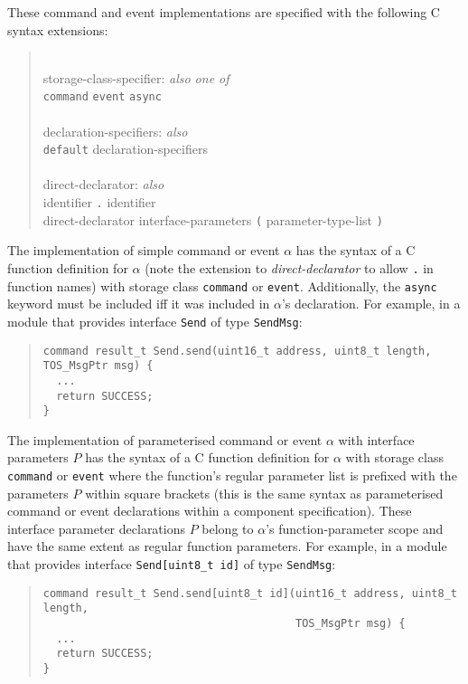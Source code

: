 \documentclass[11pt,letterpaper]{article}
\newcommand{\kw}[1]{{\tt #1}}
\newcommand{\code}[1]{{\tt #1}}
\newcommand{\grammarshift}{\vspace*{-.7cm}}
\newcommand{\grammarindent}{\hspace*{2cm}\= \\ \kill}
\begin{document}
These command and event implementations are specified with the following C
syntax extensions:
\begin{quote} \grammarshift \em \begin{tabbing}
\grammarindent
storage-class-specifier: \emph{also one of}\\
\>	\kw{command} \kw{event} \kw{async}\\
\\
declaration-specifiers: \emph{also}\\
\>	\kw{default} declaration-specifiers\\
\\
direct-declarator: \emph{also}\\
\>	identifier \kw{.} identifier \\
\>	direct-declarator interface-parameters \kw{(} parameter-type-list \kw{)}\\
\end{tabbing} \end{quote}
The implementation of simple command or event $\alpha$ has the syntax of a
C function definition for $\alpha$ (note the extension to
\emph{direct-declarator} to allow \code{.} in function names) with storage
class \kw{command} or \kw{event}. Additionally, the \kw{async} keyword must
be included iff it was included in $\alpha$'s declaration. For example, in
a module that provides interface \code{Send} of type \kw{SendMsg}:
\begin{quote} \begin{verbatim}
command result_t Send.send(uint16_t address, uint8_t length, TOS_MsgPtr msg) {
  ...
  return SUCCESS;
}
\end{verbatim} \end{quote}

The implementation of parameterised command or event $\alpha$ with interface
parameters $P$ has the syntax of a C function definition for $\alpha$ with
storage class \kw{command} or \kw{event} where the function's regular
parameter list is prefixed with the parameters $P$ within square brackets
(this is the same syntax as parameterised command or event declarations
within a component specification). These interface parameter declarations
$P$ belong to $\alpha$'s function-parameter scope and have the same extent
as regular function parameters. For example, in a module that provides
interface \code{Send[uint8\_t id]} of type \kw{SendMsg}:
\begin{quote} \begin{verbatim}
command result_t Send.send[uint8_t id](uint16_t address, uint8_t length, 
                                       TOS_MsgPtr msg) {
  ...
  return SUCCESS;
}
\end{verbatim} \end{quote}
\end{document}
